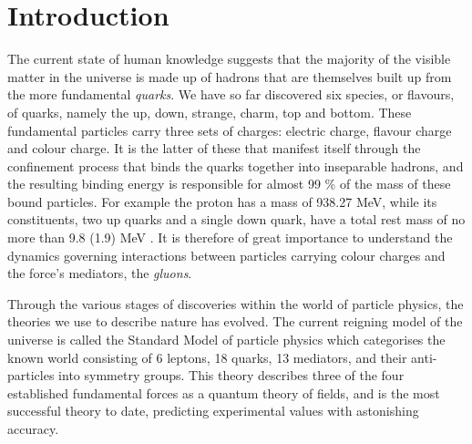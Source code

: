 \chapter{Introduction}

The current state of human knowledge suggests that the majority of the visible
matter in the universe is made up of hadrons that are themselves built up from
the more fundamental \emph{quarks}. We have so far discovered six species, or
flavours, of quarks, namely the up, down, strange, charm, top and bottom. These
fundamental particles carry three sets of charges: electric charge, flavour
charge and colour charge.  It is the latter of these that manifest itself
through the confinement process that binds the quarks together into inseparable
hadrons, and the resulting binding energy is responsible for almost 99 \% of the
mass of these bound particles. For example the proton has a mass of 938.27 MeV,
while its constituents, two up quarks and a single down quark, have a total rest
mass of no more than 9.8 (1.9) MeV \citep{Agashe:2014kda}. It is therefore of
great importance to understand the dynamics governing interactions between
particles carrying colour charges and the force's mediators, the \emph{gluons}. 

Through the various stages of discoveries within the world of particle physics,
the theories we use to describe nature has evolved. The current reigning model
of the universe is called the Standard Model of particle physics which
categorises the known world consisting of 6 leptons, 18 quarks, 13 mediators,
and their anti-particles into symmetry groups. This theory describes three of
the four established fundamental forces as a quantum theory of fields, and is
the most successful theory to date, predicting experimental values with
astonishing accuracy.
